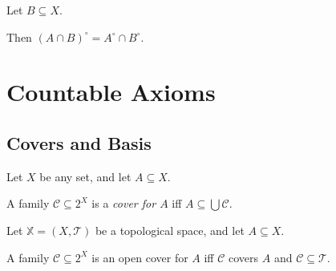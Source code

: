 \begin{corollary}
	Let $B \subseteq X$.
	
	Then $(A \cap B)^\circ = A^\circ \cap B^\circ$.
\end{corollary}


\chapter{Countable Axioms}


\section{Covers and Basis}


\begin{definition}
	Let $X$ be any set, and let $A \subseteq X$.
	
	A family $\mathcal C \subseteq 2^X$ is a \textit{cover for $A$} iff $A \subseteq \bigcup \mathcal C$.
\end{definition}


\begin{definition}
	Let $\mathbb X = (X, \mathcal T)$ be a topological space, and let $A \subseteq X$.
	
	A family $\mathcal C \subseteq 2^X$ is an open cover for $A$ iff $\mathcal C$ covers $A$ and $\mathcal C \subseteq \mathcal T$.
\end{definition}
































%